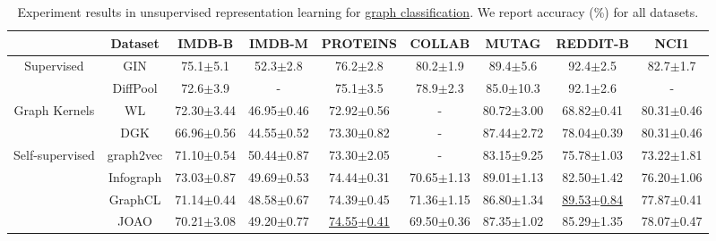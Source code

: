 \begin{table}[htbp]
    \centering
    \caption{Experiment results in unsupervised representation learning for \underline{graph classification}. \textmd{We report accuracy (\%) for all datasets.}}
    \begin{threeparttable}
    \renewcommand\arraystretch{1.05}
    \begin{tabular}{c|c|ccccccc}
        \toprule[1.2pt]
              & Dataset  & IMDB-B     & IMDB-M     & PROTEINS   & COLLAB     & MUTAG      & REDDIT-B   & NCI1     \\ %

        \midrule
        \multirow{2}{*}{Supervised}
        & GIN         & 75.1$\pm$5.1   & 52.3$\pm$2.8   & 76.2$\pm$2.8   & 80.2$\pm$1.9   & 89.4$\pm$5.6   & 92.4$\pm$2.5   & 82.7$\pm$1.7 \\ %
        & DiffPool    & 72.6$\pm$3.9 &  -           &  75.1$\pm$3.5   & 78.9$\pm$2.3 & 85.0$\pm$10.3 & 92.1$\pm$2.6 & - \\
        \midrule
        \multirow{2}{*}{Graph Kernels}
        & WL          & 72.30$\pm$3.44 & 46.95$\pm$0.46 & 72.92$\pm$0.56 & - & 80.72$\pm$3.00 & 68.82$\pm$0.41 & 80.31$\pm$0.46 \\ %
        & DGK         & 66.96$\pm$0.56 & 44.55$\pm$0.52 & 73.30$\pm$0.82 & - & 87.44$\pm$2.72 & 78.04$\pm$0.39 & 80.31$\pm$0.46 \\ %
        \midrule
        \multirow{8}{*}{Self-supervised}
        & graph2vec   & 71.10$\pm$0.54 & 50.44$\pm$0.87 & 73.30$\pm$2.05 & -              & 83.15$\pm$9.25 & 75.78$\pm$1.03 & 73.22$\pm$1.81 \\ %
        & Infograph   & 73.03$\pm$0.87 & 49.69$\pm$0.53 & 74.44$\pm$0.31 & 70.65$\pm$1.13 & 89.01$\pm$1.13 & 82.50$\pm$1.42 & 76.20$\pm$1.06 \\%
        & GraphCL     & 71.14$\pm$0.44 & 48.58$\pm$0.67 & 74.39$\pm$0.45 & 71.36$\pm$1.15 & 86.80$\pm$1.34 & \underline{89.53$\pm$0.84} & 77.87$\pm$0.41 \\%
        & JOAO        & 70.21$\pm$3.08 & 49.20$\pm$0.77     & \underline{74.55$\pm$0.41} & 69.50$\pm$0.36 & 87.35$\pm$1.02 & 85.29$\pm$1.35 & 78.07$\pm$0.47 \\%

\end{tabular}
\end{threeparttable}
\end{table}

